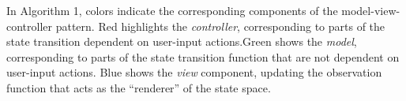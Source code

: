 \documentclass{article}
\theoremstyle{plain}
\theoremstyle{definition}
\theoremstyle{remark}
\begin{document}
In Algorithm 1, colors indicate the corresponding components of the model-view-controller pattern. Red highlights the \textit{controller}, corresponding to parts of the state transition dependent on user-input actions.Green shows the \textit{model}, corresponding to parts of the state transition function that are not dependent on user-input actions. 
Blue shows the \textit{view} component, updating the observation function that acts as the ``renderer'' of the state space. 































 
\end{document}
